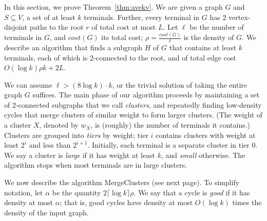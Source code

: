 \documentclass[11pt]{article}
\newcommand{\ceil}[1]{\lceil #1 \rceil}
\begin{document}
In this section, we prove Theorem~\ref{thm:avekv}. We are given a
graph $G$ and $S \subseteq V$, a set of at least $k$ terminals.
Further, every terminal in $G$ has 2 vertex-disjoint paths to the root
$r$ of total cost at most $L$. Let $\ell$ be the number of terminals
in $G$, and $cost(G)$ its total cost; $\rho = \frac{cost(G)}{\ell}$ is
the density of $G$. We describe an algorithm that finds a subgraph $H$
of $G$ that contains at least $k$ terminals, each of which is
2-connected to the root, and of total edge cost $O(\log k) \rho k + 2L$.

We can assume $\ell > (8 \log k)\cdot k$, or the trivial solution of
taking the entire graph $G$ suffices. The main phase of our algorithm
proceeds by maintaining a set of 2-connected subgraphs that we call
\emph{clusters}, and repeatedly finding low-density cycles that merge
clusters of similar weight to form larger clusters.  (The weight of a
cluster $X$, denoted by $w_X$, is (roughly) the number of terminals it
contains.) Clusters are grouped into \emph{tiers} by weight; tier $i$
contains clusters with weight at least $2^i$ and less than
$2^{i+1}$. Initially, each terminal is a separate cluster in tier
0. We say a cluster is \emph{large} if it has weight at least $k$, and
\emph{small} otherwise. The algorithm stops when most terminals are in
large clusters.

We now describe the algorithm {\sc MergeClusters} (see next page). To simplify
notation, let $\alpha$ be the quantity $2 \ceil{\log k} \rho$.  We say
that a cycle is \emph{good} if it has density at most $\alpha$; that
is, good cycles have density at most $O(\log k)$ times the density of
the input graph.
\end{document}
